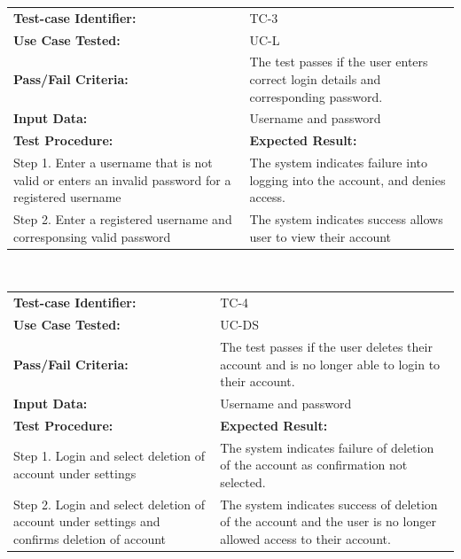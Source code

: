\documentclass[12pt]{article}
\begin{document}
{\begin{tabular}{| p{8cm} | p{8cm} |} \hline
	\textbf{Test-case Identifier:}& TC-3\\
	\textbf{Use Case Tested:}& UC-L\\
	\textbf{Pass/Fail Criteria:}& The test passes if the user enters correct login details and corresponding password.\\
	\textbf{Input Data:}& Username and password\\\hline
	\textbf{Test Procedure:}& \textbf{Expected Result:} \\\hline
	Step 1. Enter a username that is not valid or enters an invalid password for a registered username & The system indicates failure into logging into the account, and denies access. \\
	Step 2. Enter a registered username and corresponsing valid password  & The system indicates success allows user to view their account\\
		\hline
\end{tabular}
\\

\begin{tabular}{| p{8cm} | p{8cm} |} \hline
	\textbf{Test-case Identifier:}& TC-4\\
	\textbf{Use Case Tested:}& UC-DS\\
	\textbf{Pass/Fail Criteria:}& The test passes if the user deletes their account and is no longer able to login to their account.\\
	\textbf{Input Data:}& Username and password\\\hline
	\textbf{Test Procedure:}& \textbf{Expected Result:} \\\hline
	Step 1. Login and select deletion of account under settings & The system indicates failure of deletion of the account as confirmation not selected. \\
	Step 2. Login and select deletion of account under settings and confirms deletion of account& The system indicates success of deletion of the account and the user is no longer allowed access to their account.\\
		\hline
\end{tabular}

}
\end{document}
